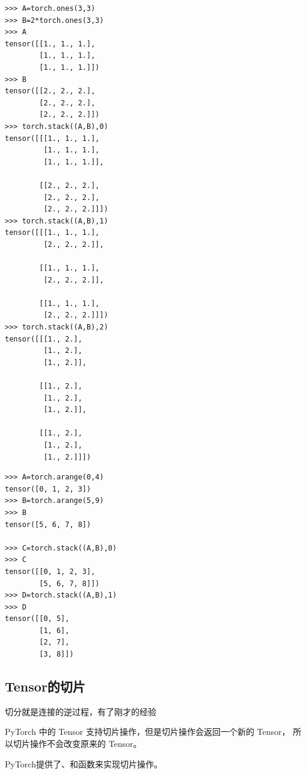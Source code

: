 \begin{lstlisting}[style=demostyle,numbers=none]
>>> A=torch.ones(3,3)
>>> B=2*torch.ones(3,3)
>>> A
tensor([[1., 1., 1.],
        [1., 1., 1.],
        [1., 1., 1.]])
>>> B
tensor([[2., 2., 2.],
        [2., 2., 2.],
        [2., 2., 2.]])
>>> torch.stack((A,B),0)
tensor([[[1., 1., 1.],
         [1., 1., 1.],
         [1., 1., 1.]],

        [[2., 2., 2.],
         [2., 2., 2.],
         [2., 2., 2.]]])
>>> torch.stack((A,B),1)
tensor([[[1., 1., 1.],
         [2., 2., 2.]],

        [[1., 1., 1.],
         [2., 2., 2.]],

        [[1., 1., 1.],
         [2., 2., 2.]]])
>>> torch.stack((A,B),2)
tensor([[[1., 2.],
         [1., 2.],
         [1., 2.]],

        [[1., 2.],
         [1., 2.],
         [1., 2.]],

        [[1., 2.],
         [1., 2.],
         [1., 2.]]])
\end{lstlisting}      



\begin{lstlisting}[style=demostyle,numbers=none]
>>> A=torch.arange(0,4)
tensor([0, 1, 2, 3])
>>> B=torch.arange(5,9)
>>> B
tensor([5, 6, 7, 8])

>>> C=torch.stack((A,B),0)
>>> C
tensor([[0, 1, 2, 3],
        [5, 6, 7, 8]])
>>> D=torch.stack((A,B),1)
>>> D
tensor([[0, 5],
        [1, 6],
        [2, 7],
        [3, 8]])
\end{lstlisting}

\subsection{Tensor的切片}
\label{subsec:Pytorch的Tensor的切片}
切分就是连接的逆过程，有了刚才的经验

PyTorch 中的 Tensor 支持切片操作，但是切片操作会返回一个新的 Tensor，
所以切片操作不会改变原来的 Tensor。

PyTorch提供了、和函数来实现切片操作。

